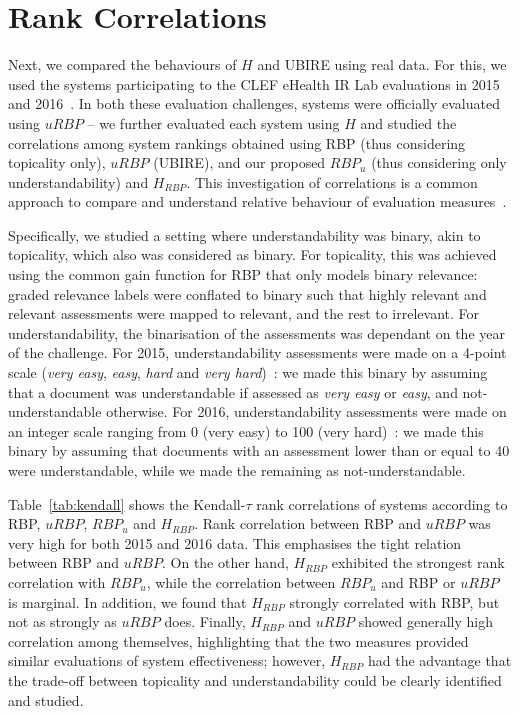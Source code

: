 



\section{Rank Correlations} %
\label{sec:clef}
Next, we compared the behaviours of $H$ and UBIRE using real data. For this, we used the systems participating to the CLEF eHealth IR Lab evaluations in 2015 and 2016~\cite{clefIR15,clefIR16}. In both these evaluation challenges, systems were officially evaluated using $uRBP$ -- we further evaluated each system using $H$ and studied the correlations among system rankings obtained using RBP (thus considering topicality only), $uRBP$ (UBIRE), and our proposed $RBP_u$ (thus considering only understandability) and $H_{RBP}$. This investigation of correlations is a common approach to compare and understand relative behaviour of evaluation measures~\cite{zuccon16}. 

Specifically, we studied a setting where understandability was binary, akin to topicality, which also was considered as binary. For topicality, this was achieved using the common gain function for RBP that only models binary relevance: graded relevance labels were conflated to binary such that highly relevant and relevant assessments were mapped to relevant, and the rest to irrelevant. For understandability, the binarisation of the assessments was dependant on the year of the challenge. For 2015, understandability assessments were made on a 4-point scale (\textit{very easy}, \textit{easy}, \textit{hard} and \textit{very hard})~\cite{clefIR15}: we made this binary by assuming that a document was understandable if assessed as \textit{very easy} or \textit{easy}, and not-understandable otherwise. For 2016, understandability assessments were made on an integer scale ranging from 0 (very easy) to 100 (very hard)~\cite{clefIR16}: we made this binary by assuming that documents with an assessment lower than or equal to 40 were understandable, while we made the remaining as not-understandable. 

Table~\ref{tab:kendall} shows the Kendall-$\tau$ rank correlations of systems according to RBP, $uRBP$, $RBP_u$ and $H_{RBP}$. Rank correlation between RBP and $uRBP$ was very high for both 2015 and 2016 data. This emphasises the tight relation between RBP and $uRBP$. On the other hand, $H_{RBP}$ exhibited the strongest rank correlation with $RBP_u$, while the correlation between $RBP_u$ and RBP or $uRBP$ is marginal. In addition, we found that $H_{RBP}$ strongly correlated with RBP, but not as strongly as  $uRBP$ does. Finally, $H_{RBP}$ and $uRBP$ showed generally high correlation among themselves, highlighting that the two measures provided similar evaluations of system effectiveness; however, $H_{RBP}$ had the advantage that the trade-off between topicality and understandability could be clearly identified and studied. 

